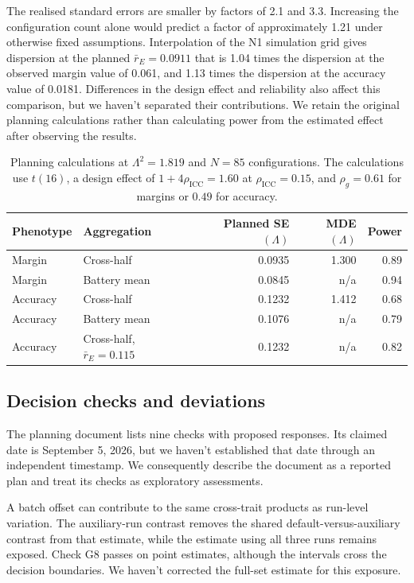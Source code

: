 The realised standard errors are smaller by factors of 2.1 and 3.3. Increasing the configuration count alone would predict a factor of approximately 1.21 under otherwise fixed assumptions. Interpolation of the N1 simulation grid gives dispersion at the planned $\bar r_E=0.0911$ that is 1.04 times the dispersion at the observed margin value of 0.061, and 1.13 times the dispersion at the accuracy value of 0.0181. Differences in the design effect and reliability also affect this comparison, but we haven't separated their contributions. We retain the original planning calculations rather than calculating power from the estimated effect after observing the results.

\begin{table}[!htb]
\centering
\caption{Planning calculations at $\Lambda^2=1.819$ and $N=85$ configurations. The calculations use $t(16)$, a design effect of $1+4\rho_{\mathrm{ICC}}=1.60$ at $\rho_{\mathrm{ICC}}=0.15$, and $\rho_g=0.61$ for margins or $0.49$ for accuracy.}
\label{tab:original4}
\small\setlength{\tabcolsep}{4pt}\renewcommand{\arraystretch}{1.12}
\begin{tabular}{llrrr}\toprule
Phenotype & Aggregation & Planned SE$(\Lambda)$ & MDE$(\Lambda)$ & Power\\\midrule
Margin & Cross-half & 0.0935 & 1.300 & 0.89\\
Margin & Battery mean & 0.0845 & n/a & 0.94\\
Accuracy & Cross-half & 0.1232 & 1.412 & 0.68\\
Accuracy & Battery mean & 0.1076 & n/a & 0.79\\
Accuracy & Cross-half, $\bar r_E=0.115$ & 0.1232 & n/a & 0.82\\\bottomrule
\end{tabular}
\end{table}

\subsection{Decision checks and deviations}
The planning document lists nine checks with proposed responses. Its claimed date is September 5, 2026, but we haven't established that date through an independent timestamp. We consequently describe the document as a reported plan and treat its checks as exploratory assessments.

A batch offset can contribute to the same cross-trait products as run-level variation. The auxiliary-run contrast removes the shared default-versus-auxiliary contrast from that estimate, while the estimate using all three runs remains exposed. Check G8 passes on point estimates, although the intervals cross the decision boundaries. We haven't corrected the full-set estimate for this exposure.

